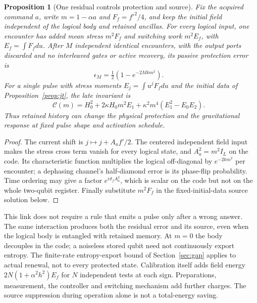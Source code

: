 \documentclass[12pt,a4paper]{article}
\newtheorem{proposition}[theorem]{Proposition}
\begin{document}
\begin{proposition}[One residual controls protection and source]
\label{prop:protection-source}
Fix the acquired command $a$, write $m=1-\alpha a$ and
$F_f=f'^2/4$, and keep the initial field independent of the logical
body and retained ancillas. For every logical input, one encounter has
added mean stress $m^2F_f$ and switching work $m^2E_f$, with
$E_f=\int F_fdu$. After $M$ independent identical encounters, with the
output ports discarded and no interleaved gates or active recovery,
its passive protection error is
\begin{equation}
 \epsilon_M=\tfrac12(1-e^{-2Mk m^2}).
 \label{eq:protection-source-risk}
\end{equation}
For a single pulse with stress moments $E_j=\int u^jF_fdu$ and the
initial data of Proposition~\ref{prop:jt}, the late invariant is
\begin{equation}
 \mathcal C(m)=H_0^2+2\kappa H_0m^2E_1
                 +\kappa^2m^4(E_1^2-E_0E_2).
 \label{eq:protection-source-invariant}
\end{equation}
Thus retained history can change the physical protection and the
gravitational response at fixed pulse shape and activation schedule.
\end{proposition}
\begin{proof}
The current shift is $j\mapsto j+A_af'/2$. The centered independent
field input makes the stress cross term vanish for every logical state,
and $A_a^2=m^2I_L$ on the code. Its characteristic function multiplies
the logical off-diagonal by $e^{-2km^2}$ per encounter; a dephasing
channel's half-diamond error is its phase-flip probability. Time ordering
may give a factor $e^{i\vartheta_f A_a^2}$, which is scalar on the code
but not on the whole two-qubit register. Finally substitute $m^2F_f$
in the fixed-initial-data source solution below.
\end{proof}

This link does not require a rule that emits a pulse only after a wrong
answer. The same interaction produces both the residual error and its
source, even when the logical body is entangled with retained memory.
At $m=0$ the body decouples in the code; a noiseless stored qubit need
not continuously export entropy. The finite-rate entropy-export bound
of Section~\ref{sec:gap} applies to actual renewal, not to every protected
state. Calibration itself adds field energy
$2N(1+\alpha^2h^2)E_f$ for $N$ independent tests at each sign.
Preparations, measurement, the controller and switching mechanism add
further charges. The source suppression during operation alone is not
a total-energy saving.
\end{document}
